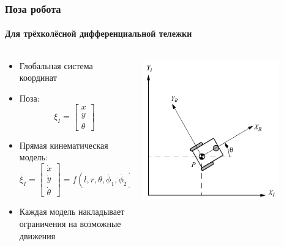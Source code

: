 \documentclass{../../slides-style}
\begin{document}
    \begin{frame}
        \frametitle{Поза робота}
        \framesubtitle{Для трёхколёсной дифференциальной тележки}
        \begin{columns}
            \begin{column}{0.6\textwidth}
                \begin{itemize}
                    \item Глобальная система координат
                    \item Поза:
                        $$\xi_I = \begin{bmatrix} x \\ y \\ \theta \end{bmatrix}$$
                    \item Прямая кинематическая модель:
                        $$\dot{\xi_I} = \begin{bmatrix} \dot{x} \\ \dot{y} \\ \dot{\theta} \end{bmatrix} = f(l, r, \theta, \dot{\phi_1}, \dot{\phi_2})$$
                    \item Каждая модель накладывает ограничения на возможные движения
                \end{itemize}
            \end{column}
            \begin{column}{0.4\textwidth}
                \begin{center}
                    \includegraphics[width=0.8\textwidth]{pose.png}
                \end{center}
            \end{column}
        \end{columns}
    \end{frame}
\end{document}

